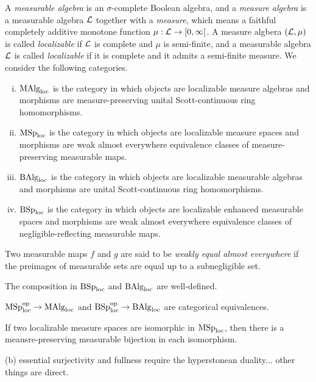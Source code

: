 \documentclass{../../large}
\begin{document}
\begin{prb}
A \emph{measurable algebra} is an $\sigma$-complete Boolean algebra, and a \emph{measure algebra} is a measurable algebra $\mathcal{L}$ together with a \emph{measure}, which means a faithful completely additive monotone function $\mu:\mathcal{L}\to[0,\infty]$.
A measure algbera $(\mathcal{L},\mu)$ is called \emph{localizable} if $\mathcal{L}$ is complete and $\mu$ is semi-finite, and a measurable algebra $\mathcal{L}$ is called \emph{localizable} if it is complete and it admits a semi-finite measure.
We consider the following categories.
\begin{enumerate}[(i)]
\item $\mathrm{MAlg}_{\mathrm{loc}}$ is the category in which objects are localizable measure algebras and morphisms are measure-preserving unital Scott-continuous ring homomorphisms.
\item $\mathrm{MSp}_{\mathrm{loc}}$ is the category in which objects are localizable measure spaces and morphisms are weak almost everywhere equivalence classes of measure-preserving measurable maps.
\item $\mathrm{BAlg}_{\mathrm{loc}}$ is the category in which objects are localizable measurable algebras and morphisms are unital Scott-continuous ring homomorphisms.
\item $\mathrm{BSp}_{\mathrm{loc}}$ is the category in which objects are localizable enhanced measurable spaces and morphisms are weak almost everywhere equivalence classes of negligible-reflecting measurable maps.
\end{enumerate}
Two measurable maps $f$ and $g$ are said to be \emph{weakly equal almost everywhere} if the preimages of measurable sets are equal up to a subnegligible set.
\begin{parts}
\item The composition in $\mathrm{BSp}_{\mathrm{loc}}$ and $\mathrm{BAlg}_{\mathrm{loc}}$ are well-defined.
\item $\mathrm{MSp}_{\mathrm{loc}}^{\mathrm{op}}\to\mathrm{MAlg}_{\mathrm{loc}}$ and $\mathrm{BSp}_{\mathrm{loc}}^{\mathrm{op}}\to\mathrm{BAlg}_{\mathrm{loc}}$ are categorical equivalences.
\item If two localizable measure spaces are isomorphic in $\mathrm{MSp}_{\mathrm{loc}}$, then there is a meausre-preserving measurable bijection in each isomorphism.
\end{parts}
\end{prb}
\begin{pf}
(b)
essential surjectivity and fullness require the hyperstonean duality...
other things are direct.


\end{pf}
\end{document}
